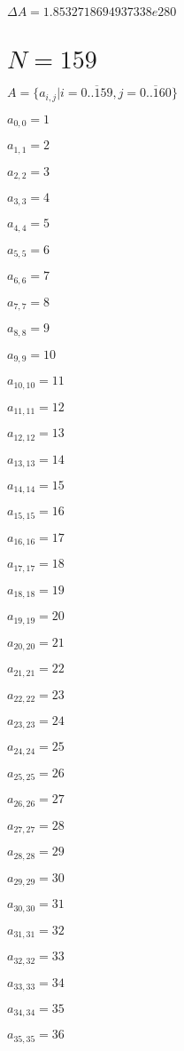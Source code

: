 \documentclass[a4paper,12pt]{article}
\begin{document}
$\Delta A = 1.8532718694937338e280$



\section{ $N = 159$ }
$A = \{ a _{ i, j } | i = \overline { 0..159 }, j = \overline { 0..160 } \}$

$a _{ 0, 0 } = 1$

$a _{ 1, 1 } = 2$

$a _{ 2, 2 } = 3$

$a _{ 3, 3 } = 4$

$a _{ 4, 4 } = 5$

$a _{ 5, 5 } = 6$

$a _{ 6, 6 } = 7$

$a _{ 7, 7 } = 8$

$a _{ 8, 8 } = 9$

$a _{ 9, 9 } = 10$

$a _{ 10, 10 } = 11$

$a _{ 11, 11 } = 12$

$a _{ 12, 12 } = 13$

$a _{ 13, 13 } = 14$

$a _{ 14, 14 } = 15$

$a _{ 15, 15 } = 16$

$a _{ 16, 16 } = 17$

$a _{ 17, 17 } = 18$

$a _{ 18, 18 } = 19$

$a _{ 19, 19 } = 20$

$a _{ 20, 20 } = 21$

$a _{ 21, 21 } = 22$

$a _{ 22, 22 } = 23$

$a _{ 23, 23 } = 24$

$a _{ 24, 24 } = 25$

$a _{ 25, 25 } = 26$

$a _{ 26, 26 } = 27$

$a _{ 27, 27 } = 28$

$a _{ 28, 28 } = 29$

$a _{ 29, 29 } = 30$

$a _{ 30, 30 } = 31$

$a _{ 31, 31 } = 32$

$a _{ 32, 32 } = 33$

$a _{ 33, 33 } = 34$

$a _{ 34, 34 } = 35$

$a _{ 35, 35 } = 36$
\end{document}
